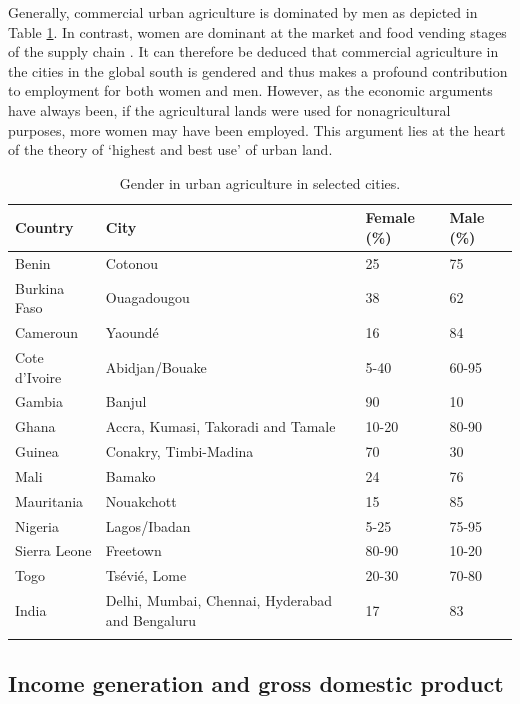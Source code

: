 Generally, commercial urban agriculture is dominated by men as depicted in Table \ref{tbl:genderinUA}. In contrast, women are dominant at the market and food vending stages of the supply chain \cite{Drechsel2014}. It can therefore be deduced that commercial agriculture in the cities in the global south is gendered and thus makes a profound contribution to employment for both women and men. However, as the economic arguments have always been, if the agricultural lands were used for nonagricultural purposes, more women may have been employed. This argument lies at the heart of the theory of ‘highest and best use’ of urban land.

\begin{table}[th]
\caption{Gender in urban agriculture in selected cities. \cite{Amoah2007}}
\begin{center}
\begin{tabular}{ p{} p{} p{} p{} } 
\hline
Country & City & Female (\%) & Male (\%) \\
\hline
Benin & Cotonou & 25 & 75 \\
Burkina Faso & Ouagadougou & 38 & 62 \\
Cameroun & Yaoundé & 16 & 84 \\
Cote d'Ivoire & Abidjan/Bouake & 5-40 & 60-95 \\
Gambia & Banjul & 90 & 10 \\
Ghana & Accra, Kumasi, Takoradi and Tamale & 10-20 & 80-90 \\
Guinea & Conakry, Timbi-Madina & 70 & 30 \\
Mali & Bamako & 24 & 76 \\
Mauritania & Nouakchott & 15 & 85 \\
Nigeria & Lagos/Ibadan & 5-25 & 75-95 \\
Sierra Leone & Freetown & 80-90 & 10-20 \\
Togo & Tsévié, Lome & 20-30 & 70-80 \\
India & Delhi, Mumbai, Chennai, Hyderabad and Bengaluru & 17 & 83 \\
\hline
\label{tbl:genderinUA}
\end{tabular}
\end{center}
\end{table}

\subsection{Income generation and gross domestic product}

